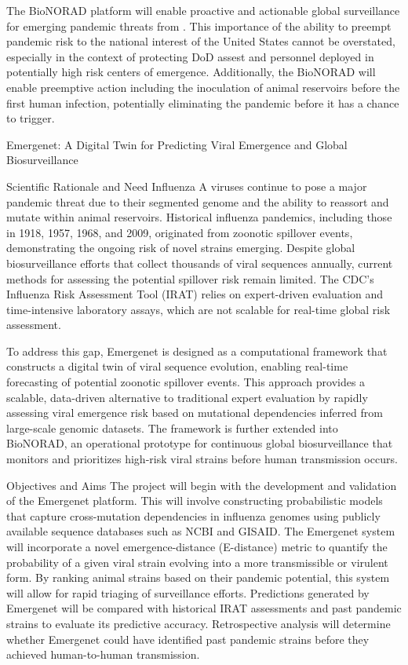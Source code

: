 \documentclass[onecolumn, compsoc,10pt]{IEEEtran}
\begin{document}
The BioNORAD platform will enable proactive and actionable global surveillance for emerging pandemic threats from \infl. This importance of the ability to preempt pandemic risk to the national interest of the United States cannot be overstated, especially in the context of protecting  DoD assest and personnel deployed in potentially high risk centers of emergence. Additionally, the BioNORAD will enable preemptive action including the inoculation of  animal reservoirs before the first human infection, potentially eliminating the pandemic before it has a chance to  trigger.





Emergenet: A Digital Twin for Predicting Viral Emergence and Global Biosurveillance

Scientific Rationale and Need
Influenza A viruses continue to pose a major pandemic threat due to their segmented genome and the ability to reassort and mutate within animal reservoirs. Historical influenza pandemics, including those in 1918, 1957, 1968, and 2009, originated from zoonotic spillover events, demonstrating the ongoing risk of novel strains emerging. Despite global biosurveillance efforts that collect thousands of viral sequences annually, current methods for assessing the potential spillover risk remain limited. The CDC’s Influenza Risk Assessment Tool (IRAT) relies on expert-driven evaluation and time-intensive laboratory assays, which are not scalable for real-time global risk assessment.

To address this gap, Emergenet is designed as a computational framework that constructs a digital twin of viral sequence evolution, enabling real-time forecasting of potential zoonotic spillover events. This approach provides a scalable, data-driven alternative to traditional expert evaluation by rapidly assessing viral emergence risk based on mutational dependencies inferred from large-scale genomic datasets. The framework is further extended into BioNORAD, an operational prototype for continuous global biosurveillance that monitors and prioritizes high-risk viral strains before human transmission occurs.

Objectives and Aims
The project will begin with the development and validation of the Emergenet platform. This will involve constructing probabilistic models that capture cross-mutation dependencies in influenza genomes using publicly available sequence databases such as NCBI and GISAID. The Emergenet system will incorporate a novel emergence-distance (E-distance) metric to quantify the probability of a given viral strain evolving into a more transmissible or virulent form. By ranking animal strains based on their pandemic potential, this system will allow for rapid triaging of surveillance efforts. Predictions generated by Emergenet will be compared with historical IRAT assessments and past pandemic strains to evaluate its predictive accuracy. Retrospective analysis will determine whether Emergenet could have identified past pandemic strains before they achieved human-to-human transmission.
\end{document}
